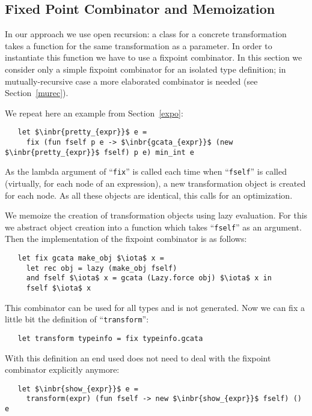 \subsection{Fixed Point Combinator and Memoization}

In our approach we use open recursion: a class for a concrete transformation takes a function for the same transformation as a parameter. In order
to instantiate this function we have to use a fixpoint combinator. In this section we consider only a simple fixpoint combinator for an isolated
type definition; in mutually-recursive case a more elaborated combinator is needed (see Section~\ref{murec}).

We repeat here an example from Section~\ref{expo}:

\begin{lstlisting}
   let $\inbr{pretty_{expr}}$ e =
     fix (fun fself p e -> $\inbr{gcata_{expr}}$ (new $\inbr{pretty_{expr}}$ fself) p e) min_int e
\end{lstlisting}

As the lambda argument of ``\lstinline{fix}'' is called each time when ``\lstinline{fself}'' is called (virtually, for each node of
an expression), a new transformation object is created for each node. As all these objects are identical, this calls for an optimization. 

We memoize the creation of transformation objects using lazy evaluation. For this we abstract object creation into a
function which takes ``\lstinline{fself}'' as an argument. Then the implementation of the fixpoint combinator is as follows:

\begin{lstlisting}
   let fix gcata make_obj $\iota$ x =
     let rec obj = lazy (make_obj fself)
     and fself $\iota$ x = gcata (Lazy.force obj) $\iota$ x in
     fself $\iota$ x
\end{lstlisting}

This combinator can be used for all types and is not generated. Now we can fix a little bit the definition of ``\lstinline{transform}'':

\begin{lstlisting}
   let transform typeinfo = fix typeinfo.gcata
\end{lstlisting}

With this definition an end used does not need to deal with the fixpoint combinator explicitly anymore:

\begin{lstlisting}
   let $\inbr{show_{expr}}$ e =
     transform(expr) (fun fself -> new $\inbr{show_{expr}}$ fself) () e
\end{lstlisting}

